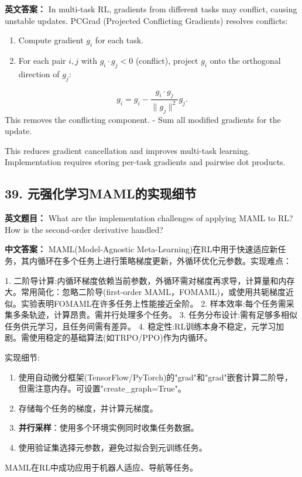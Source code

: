 \documentclass[10pt,a4paper]{ctexart}
\begin{document}
\textbf{英文答案：}  
In multi-task RL, gradients from different tasks may conflict, causing unstable updates.  PCGrad  (Projected Conflicting Gradients) resolves conflicts:

\begin{enumerate}
    \item Compute gradient \(g_i\) for each task.
    \item For each pair \(i,j\) with \(g_i \cdot g_j < 0\) (conflict), project \(g_i\) onto the orthogonal direction of \(g_j\):
\end{enumerate}
  \[
  g_i = g_i - \frac{g_i \cdot g_j}{\|g_j\|^2} g_j.
  \]  
  This removes the conflicting component.
- Sum all modified gradients for the update.

This reduces gradient cancellation and improves multi-task learning. Implementation requires storing per-task gradients and pairwise dot products.

\subsection*{39. 元强化学习MAML的实现细节}
\textbf{英文题目：} What are the implementation challenges of applying MAML to RL? How is the second-order derivative handled?

\textbf{中文答案：}  
MAML(Model-Agnostic Meta-Learning)在RL中用于快速适应新任务，其内循环在多个任务上进行策略梯度更新，外循环优化元参数。实现难点：

1.  二阶导计算:内循环梯度依赖当前参数，外循环需对梯度再求导，计算量和内存大。常用简化：忽略二阶导(first-order MAML，FOMAML)，或使用共轭梯度近似。实验表明FOMAML在许多任务上性能接近全阶。
2.  样本效率:每个任务需采集多条轨迹，计算昂贵。需并行处理多个任务。
3.  任务分布设计:需有足够多相似任务供元学习，且任务间需有差异。
4.  稳定性:RL训练本身不稳定，元学习加剧。需使用稳定的基础算法(如TRPO/PPO)作为内循环。

 实现细节:
\begin{enumerate}
    \item 使用自动微分框架(TensorFlow/PyTorch)的"grad"和"grad"嵌套计算二阶导，但需注意内存。可设置"create_graph=True"。
    \item 存储每个任务的梯度，并计算元梯度。
    \item \textbf{并行采样}：使用多个环境实例同时收集任务数据。
    \item 使用验证集选择元参数，避免过拟合到元训练任务。
\end{enumerate}

MAML在RL中成功应用于机器人适应、导航等任务。
\end{document}
